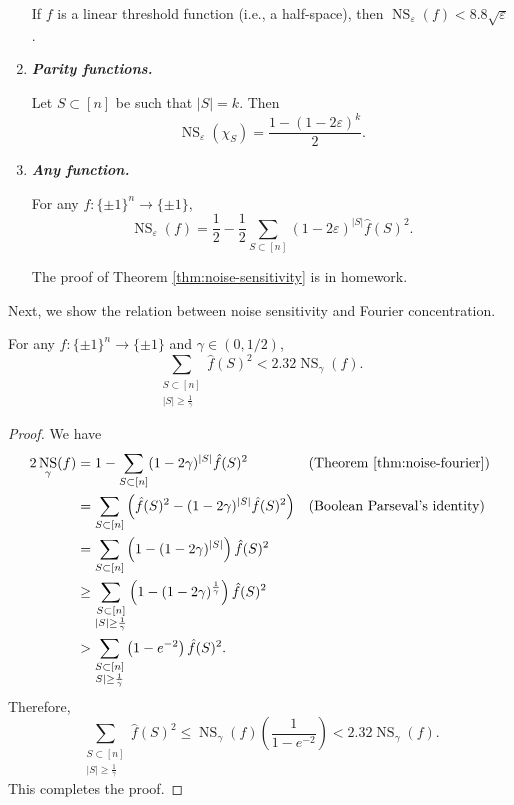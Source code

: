 \documentclass[letterpaper, reqno,11pt]{article}
\DeclareMathOperator{\NS}{NS}
\begin{document}
\begin{enumerate}[label=(\roman*)]
  \begin{theorem}
    If $f$ is a linear threshold function (i.e., a half-space), then $\NS_\varepsilon(f) < 8.8 \sqrt{\varepsilon}$.
  \end{theorem}
  \item {\bf \em Parity functions.}
  
  \begin{proposition}
    Let $S \subset [n]$ be such that $|S| = k$. Then
    $$ \NS_\varepsilon\left(\chi_S\right) = \frac{1 - (1 - 2\varepsilon)^k}{2}. $$
  \end{proposition}

  \item {\bf \em Any function.}
  
  \begin{theorem} \label{thm:noise-sensitivity}
    For any $f : \{ \pm 1 \}^n \to \{ \pm 1 \}$,
    $$ \NS_\varepsilon(f) = \frac{1}{2} - \frac{1}{2} \sum_{S \subset [n]} (1 - 2\varepsilon)^{|S|} \hat{f}(S)^2. $$
  \end{theorem}
  
  The proof of Theorem \ref{thm:noise-sensitivity} is in homework.
\end{enumerate}

Next, we show the relation between noise sensitivity and Fourier concentration.

\begin{theorem} \label{thm:noise-fourier}
  For any $f : \{ \pm 1 \}^n \to \{ \pm 1 \}$ and $\gamma \in (0, 1/2)$,
  $$ \sum_{\substack{S \subset [n] \\ |S| \geq \frac{1}{\gamma}}} \hat{f}(S)^2 < 2.32 \NS_\gamma(f). $$
\end{theorem}

\begin{proof}
  We have
  \begin{align*}
    2\NS_\gamma(f) &= 1 - \sum_{S \subset [n]} (1 - 2\gamma)^{|S|} \hat{f}(S)^2 && \text{(Theorem \ref{thm:noise-fourier})} \\
    &= \sum_{S \subset [n]} \left(\hat{f}(S)^2 - (1 - 2\gamma)^{|S|} \hat{f}(S)^2\right) && \text{(Boolean Parseval's identity)} \\
    &= \sum_{S \subset [n]} \left(1 - (1 - 2\gamma)^{|S|}\right) \hat{f}(S)^2 \\
    &\geq \sum_{\substack{S \subset [n] \\ |S| \geq \frac{1}{\gamma}}} \left(1 - (1 - 2\gamma)^\frac{1}{\gamma}\right) \hat{f}(S)^2 \\
    &> \sum_{\substack{S \subset [n] \\ S| \geq \frac{1}{\gamma}}} \left(1 - e^{-2}\right) \hat{f}(S)^2.
  \end{align*}
  Therefore,
  $$ \sum_{\substack{S \subset [n] \\ |S| \geq \frac{1}{\gamma}}} \hat{f}(S)^2 \leq \NS_\gamma(f) \left(\frac{1}{1 - e^{-2}}\right) < 2.32 \NS_\gamma(f). $$
  This completes the proof.
\end{proof}
\end{document}
